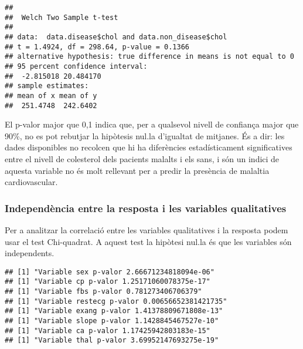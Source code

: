 \documentclass[12,]{article}
\newenvironment{Shaded}{\begin{snugshade}}{\end{snugshade}}
\newcommand{\ControlFlowTok}[1]{\textcolor[rgb]{0.13,0.29,0.53}{\textbf{#1}}}
\newcommand{\KeywordTok}[1]{\textcolor[rgb]{0.13,0.29,0.53}{\textbf{#1}}}
\newcommand{\NormalTok}[1]{#1}
\newcommand{\OperatorTok}[1]{\textcolor[rgb]{0.81,0.36,0.00}{\textbf{#1}}}
\newcommand{\StringTok}[1]{\textcolor[rgb]{0.31,0.60,0.02}{#1}}
\begin{document}
\begin{verbatim}
## 
##  Welch Two Sample t-test
## 
## data:  data.disease$chol and data.non_disease$chol
## t = 1.4924, df = 298.64, p-value = 0.1366
## alternative hypothesis: true difference in means is not equal to 0
## 95 percent confidence interval:
##  -2.815018 20.484170
## sample estimates:
## mean of x mean of y 
##  251.4748  242.6402
\end{verbatim}

El p-valor major que 0,1 indica que, per a qualsevol nivell de confiança
major que 90\%, no es pot rebutjar la hipòtesis nul.la d'igualtat de
mitjanes. És a dir: les dades disponibles no recolcen que hi ha
diferències estadísticament significatives entre el nivell de colesterol
dels pacients malalts i els sans, i són un indici de aquesta variable no
és molt rellevant per a predir la presència de malaltia cardiovascular.

\hypertarget{independencia-entre-la-resposta-i-les-variables-qualitatives}{%
\subsubsection{Independència entre la resposta i les variables
qualitatives}\label{independencia-entre-la-resposta-i-les-variables-qualitatives}}

Per a analitzar la correlació entre les variables qualitatives i la
resposta podem usar el test Chi-quadrat. A aquest test la hipòtesi
nul.la és que les variables són independents.

\begin{Shaded}
\end{Shaded}

\begin{verbatim}
## [1] "Variable sex p-valor 2.66671234818094e-06"
## [1] "Variable cp p-valor 1.25171060078375e-17"
## [1] "Variable fbs p-valor 0.781273406706379"
## [1] "Variable restecg p-valor 0.00656652381421735"
## [1] "Variable exang p-valor 1.41378809671808e-13"
## [1] "Variable slope p-valor 1.1428845467527e-10"
## [1] "Variable ca p-valor 1.17425942803183e-15"
## [1] "Variable thal p-valor 3.69952147693275e-19"
\end{verbatim}
\end{document}
